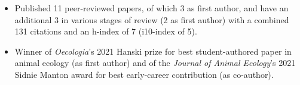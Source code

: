


\begin{itemize}
  \item Published 11 peer-reviewed papers, of which 3 as first author, and have an additional 3 in various stages of review (2 as first author) with a combined 131 citations and an h-index of 7 (i10-index of 5).
  \item Winner of \textit{Oecologia}'s 2021 Hanski prize for best student-authored paper in animal ecology (as first author) and of the \textit{Journal of Animal Ecology}'s 2021 Sidnie Manton award for best early-career contribution (as co-author).
\end{itemize}